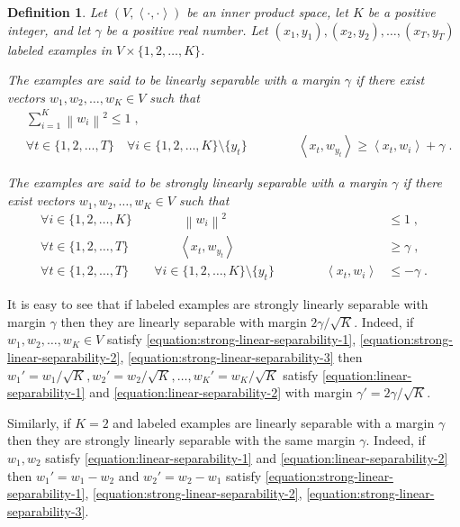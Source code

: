 \documentclass[12pt]{article}
\newtheorem{definition}{Definition}
\newcommand{\ip}[2]{\left\langle #1, #2 \right\rangle} %
\newcommand{\norm}[1]{\left\| #1 \right\|}  %
\begin{document}
\begin{definition}
Let $(V,\ip{\cdot}{\cdot})$ be an inner product space, let $K$ be a positive
integer, and let $\gamma$ be a positive real number. Let $(x_1, y_1), (x_2,
y_2), \dots, (x_T, y_T)$ labeled examples in $V \times \{1,2,\dots,K\}$.

The examples are said to be \emph{linearly separable with a
margin $\gamma$} if there exist vectors $w_1, w_2, \dots, w_K \in V$ such
that
\begin{align}
\label{equation:linear-separability-1}
& \sum_{i=1}^K \norm{w_i}^2 \le 1 \; , \\
\label{equation:linear-separability-2}
& \forall t \in \{1,2,\dots,T\} \quad \forall i \in \{1,2,\dots, K\} \setminus \{y_t\} \qquad \qquad \ip{x_t}{w_{y_t}} \ge \ip{x_t}{w_i} + \gamma \; .
\end{align}

The examples are said to be \emph{strongly linearly separable with a
margin $\gamma$} if there exist vectors $w_1, w_2, \dots, w_K \in V$ such
that
\begin{align}
\label{equation:strong-linear-separability-1}
\forall i \in \{1,2,\dots,K\} \qquad \qquad \norm{w_i}^2 & \le 1 \; , \\
\label{equation:strong-linear-separability-2}
\forall t \in \{1,2,\dots,T\} \qquad \qquad \ip{x_t}{w_{y_t}} &\ge \gamma \; , \\
\label{equation:strong-linear-separability-3}
\forall t \in \{1,2,\dots,T\} \qquad \forall i \in \{1,2,\dots, K\} \setminus \{y_t\} \qquad \qquad \ip{x_t}{w_i} & \le - \gamma \; .
\end{align}
\end{definition}

It is easy to see that if labeled examples are strongly linearly
separable with margin $\gamma$ then they are linearly separable with margin
$2\gamma/\sqrt{K}$. Indeed, if $w_1, w_2, \dots, w_K \in V$
satisfy \eqref{equation:strong-linear-separability-1},
\eqref{equation:strong-linear-separability-2},
\eqref{equation:strong-linear-separability-3} then $w_1' = w_1/\sqrt{K}, w_2' =
w_2/\sqrt{K}, \dots, w_K' = w_K/\sqrt{K}$ satisfy
\eqref{equation:linear-separability-1} and
\eqref{equation:linear-separability-2} with margin $\gamma' = 2\gamma/\sqrt{K}$.

Similarly, if $K=2$ and labeled examples are linearly separable with a margin
$\gamma$ then they are strongly linearly separable with the same margin
$\gamma$. Indeed, if $w_1, w_2$ satisfy \eqref{equation:linear-separability-1}
and \eqref{equation:linear-separability-2} then $w_1' = w_1 - w_2$ and $w_2' =
w_2 - w_1$ satisfy \eqref{equation:strong-linear-separability-1},
\eqref{equation:strong-linear-separability-2},
\eqref{equation:strong-linear-separability-3}.
\end{document}
